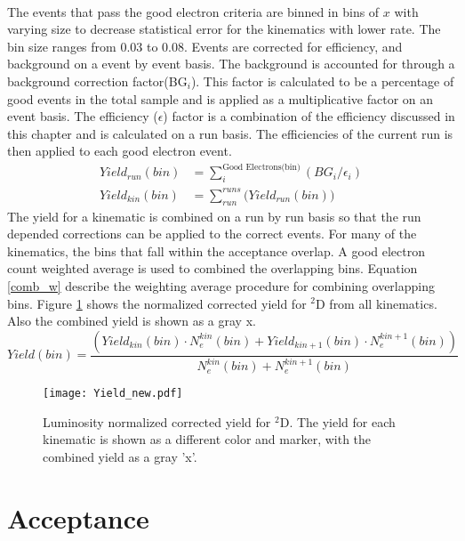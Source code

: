 \paragraph{}The events that pass the good electron criteria are binned in bins of $x$ with varying size to decrease statistical error for the kinematics with lower rate. The bin size ranges from 0.03 to 0.08. Events are corrected for efficiency, and background on a event by event basis. The background is accounted for through a background correction factor(BG$_i$). This factor is calculated to be a percentage of good events in the total sample and is applied as a multiplicative factor on an event basis. The efficiency ($\epsilon$) factor is a combination of the efficiency discussed in this chapter and is calculated on a run basis. The efficiencies of the current run is then applied to each good electron event. 
\begin{align}
Yield_{run}(bin) &= \sum_{i}^{\text{Good Electrons(bin)} } \left( BG_{i}/\epsilon_{i} \right) \nonumber\\
Yield_{kin}(bin) &= \sum_{run}^{runs} \bigg( Yield_{run}(bin) \bigg)
\end{align}
The yield for a kinematic is combined on a run by run basis so that the run depended corrections can be applied to the correct events. For many of the kinematics, the bins that fall within the acceptance overlap. A good electron count weighted average is used to combined the overlapping bins. Equation \ref{comb_w} describe the weighting average procedure for combining overlapping bins. Figure \ref{kinYield} shows the normalized corrected yield for $^2$D from all kinematics. Also the combined yield is shown as a gray x. 
\begin{equation}
Yield(bin) = \frac{\left( Yield_{kin}(bin)\cdot N_e^{kin}(bin)+ Yield_{kin+1}(bin)\cdot N_e^{kin+1}(bin) \right)}{N_e^{kin}(bin)+N_e^{kin+1}(bin)} \label{comb_w}
\end{equation}
\begin{figure}
	\caption{Luminosity normalized corrected yield for $^2$D. The yield for each kinematic is shown as a different color and marker, with the combined yield as a gray 'x'.  \label{kinYield}}
	\texttt{[image: Yield\_new.pdf]}
\end{figure}
\section{Acceptance } 
